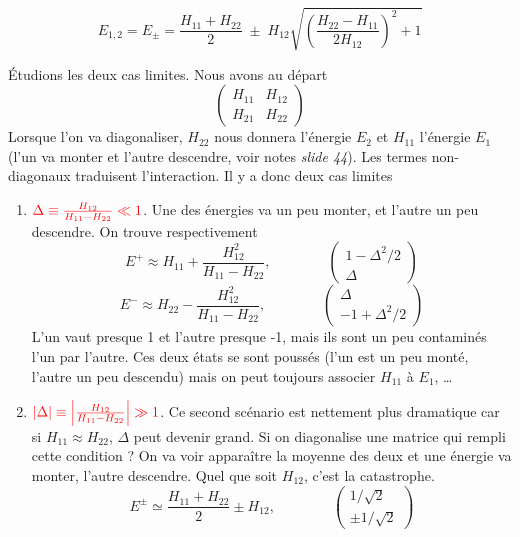 \begin{equation}
E_{1,2} 
= E_\pm =\frac{H_{11} + H_{22}}{2}
\; \pm \;  H_{12} \sqrt{
\left( \frac{H_{22} - H_{11}}{2 H_{12}} \right)^2 + 1
}
\end{equation}

Étudions les deux cas limites. Nous avons au départ 
\begin{equation}
\left(\begin{array}{cc}
H_{11}&H_{12}\\
H_{21}&H_{22}
\end{array}\right)
\end{equation}
Lorsque l'on va diagonaliser, $H_{22}$ nous donnera l'énergie $E_2$ et $H_{11}$ 
l'énergie $E_1$ (l'un va monter et l'autre descendre, voir notes \textit{slide 44}). Les termes
non-diagonaux traduisent l'interaction. Il y a donc deux cas limites
\begin{enumerate}
\item ${\color{red} \Delta \equiv 
\frac{H_{12}}{H_{11}-H_{22}} \ll 1 }$. Une des énergies va un peu monter, et l'autre un peu
descendre. On trouve respectivement
\begin{equation}
E^+ \approx H_{11} + \dfrac{H_{12}^2}{H_{11}-H_{22}},\qquad\qquad
\left(\begin{array}{c}
1-\Delta^2/2\\
\Delta
\end{array}\right)
\end{equation}
\begin{equation}
E^- \approx H_{22} - \dfrac{H_{12}^2}{H_{11}-H_{22}},\qquad\qquad
\left(\begin{array}{c}
\Delta\\
-1+\Delta^2/2
\end{array}\right)
\end{equation}
L'un vaut presque 1 et l'autre presque -1, mais ils sont un peu contaminés l'un par l'autre. Ces
deux états se sont poussés (l'un est un peu monté, l'autre un peu descendu) mais on peut toujours
associer $H_{11}$ à $E_1$, \dots 
\item ${\color{red} 
\vert \Delta \vert \equiv 
\left\vert 
\frac{H_{12}}{H_{11}-H_{22}} \right\vert  \gg 1}$. Ce second scénario est nettement plus 
dramatique car si $H_{11}\approx H_{22}$, $\Delta$ peut devenir grand. Si on diagonalise une
matrice qui rempli cette condition ? On va voir apparaître la moyenne des deux et une énergie
va monter, l'autre descendre. Quel que soit $H_{12}$, c'est la catastrophe.
\begin{equation}
E^\pm
 \simeq
\frac{H_{11} + H_{22}}{2} \pm H_{12},\qquad\qquad\left( 
\begin{array}{c}
1/ \sqrt{2} \\ \pm  1/ \sqrt{2}  \end{array} \right)
\end{equation}
\end{enumerate}

